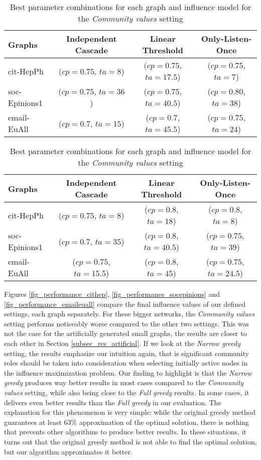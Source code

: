 \documentclass[pdflatex,sn-mathphys-ay]{sn-jnl}
\begin{document}
\begin{table}[ht]
\caption{Best parameter combinations for each graph and influence model for the \textit{Narrow greedy} setting}
\label{table_best_combinations_narrow_big}
\centering
\begin{tabular}{@{}l|ccc@{}}
\toprule
Graphs & Independent Cascade & Linear Threshold & Only-Listen-Once \\
\midrule
cit-HepPh & ($cp=0.75$, $ta=8$) & ($cp=0.75$, $ta=17.5$) & ($cp=0.75$, $ta=7$) \\
soc-Epinions1 & ($cp=0.75$, $ta=36$) & ($cp=0.75$, $ta=40.5$) & ($cp=0.80$, $ta=38$) \\
email-EuAll & ($cp=0.7$, $ta=15$) & ($cp=0.7$, $ta=45.5$) & ($cp=0.75$, $ta=24$) \\
\bottomrule
\end{tabular}
\vspace{5mm}
\caption{Best parameter combinations for each graph and influence model for the \textit{Community values} setting}
\label{table_best_combinations_community_values_big}
\centering
\begin{tabular}{@{}l|ccc@{}}
\toprule
Graphs & Independent Cascade & Linear Threshold & Only-Listen-Once \\
\midrule
cit-HepPh & ($cp=0.75$, $ta=8$) & ($cp=0.8$, $ta=18$) & ($cp=0.8$, $ta=8$) \\
soc-Epinions1 & ($cp=0.7$, $ta=35$) & ($cp=0.8$, $ta=40.5$) & ($cp=0.75$, $ta=39$) \\
email-EuAll & ($cp=0.75$, $ta=15.5$) & ($cp=0.8$, $ta=45$) & ($cp=0.75$, $ta=24.5$) \\
\bottomrule
\end{tabular}
\end{table}

Figures \ref{fig_performance_cithep}, \ref{fig_performance_socepinions} and \ref{fig_performance_emaileuall} compare the final influence values of our defined settings, each graph separately. For these bigger networks, the \textit{Community values} setting performs noticeably worse compared to the other two settings. This was not the case for the artificially generated small graphs, the results are closer to each other in Section \ref{subsec_res_artificial}. If we look at the \textit{Narrow greedy} setting, the results emphasize our intuition again, that is significant community roles should be taken into consideration when selecting initially active nodes in the influence maximization problem. Our finding to highlight is that the \textit{Narrow greedy} produces way better results in most cases compared to the \textit{Community values} setting, while also being close to the \textit{Full greedy} results. In some cases, it delivers even better results than the \textit{Full greedy} in our evaluation. The explanation for this phenomenon is very simple: while the original greedy method guarantees at least $63\%$ approximation of the optimal solution, there is nothing that prevents other algorithms to produce better results. In these situations, it turns out that the original greedy method is not able to find the optimal solution, but our algorithm approximates it better.
\end{document}
